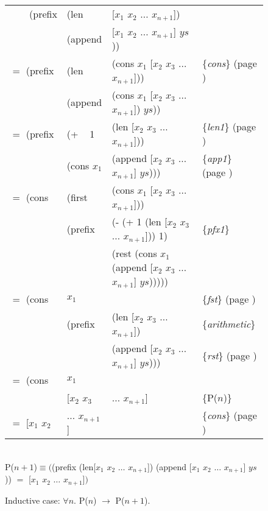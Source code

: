 \begin{figure}
\begin{center}
\begin{spacing}{0.9}
\addtolength{\tabcolsep}{-5pt}
\begin{tabular}{llll}
~~~~\textsf{(prefix} &\textsf{(len}    &\textsf{[$x_1$ $x_2$ $\dots$ $x_{n+1}$])}    &\\
            &\textsf{(append} &\textsf{[$x_1$ $x_2$ $\dots$ $x_{n+1}$] $ys$))}       &\\
$=$ \textsf{(prefix} &\textsf{(len}    &\textsf{(cons $x_1$ [$x_2$ $x_3$ $\dots$ $x_{n+1}$]))}&\{\emph{cons}\} (page \pageref{first-rest-cons})\\
            &\textsf{(append} &\textsf{(cons $x_1$ [$x_2$ $x_3$ $\dots$ $x_{n+1}$]) $ys$))}&\\
$=$	\textsf{(prefix} &\textsf{(+ ~ 1}  &\textsf{(len [$x_2$ $x_3$ $\dots$ $x_{n+1}$]))}       &\{\emph{len1}\} (page \pageref{len-equations})\\
            &\textsf{(cons $x_1$}  &\textsf{(append [$x_2$ $x_3$ $\dots$ $x_{n+1}$] $ys$)))}&\{\emph{app1}\} (page \pageref{append-equations})\\
$=$ \textsf{(cons}   &\textsf{(first}  &\textsf{(cons $x_1$ [$x_2$ $x_3$ $\dots$ $x_{n+1}$]))}&\\
            &\textsf{(prefix} &\textsf{(- (+ 1 (len [$x_2$ $x_3$ $\dots$ $x_{n+1}$])) 1)}&\{\emph{pfx1}\}\\
            &        &\textsf{(rest (cons $x_1$ (append [$x_2$ $x_3$ $\dots$ $x_{n+1}$] $ys$)))))}&\\
$=$ \textsf{(cons}   &$x_1$   &                                           &\{\emph{fst}\} (page \pageref{first-rest-cons})\\
            &\textsf{(prefix} &\textsf{(len [$x_2$ $x_3$ $\dots$ $x_{n+1}$])}        &\{\emph{arithmetic}\}\\
            &        &\textsf{(append [$x_2$ $x_3$ $\dots$ $x_{n+1}$] $ys$)))}& \{\emph{rst}\} (page \pageref{first-rest-cons})\\
$=$ \textsf{(cons}   &$x_1$   &                                          &\\
            &\textsf{[$x_2$ $x_3$} &$\dots$ $x_{n+1}$]                   &\{P($n$)\} \\
$=$ \textsf{[$x_1$ $x_2$} & \textsf{$\dots$ $x_{n+1}$]}                  &&\{\emph{cons}\} (page \pageref{first-rest-cons}) \\
\end{tabular}
\addtolength{\tabcolsep}{5pt}
\end{spacing}
~~\vspace{1mm}\\
P($n+1$)$\equiv($\textsf{(prefix (len[$x_1$ $x_2$ $\dots$ $x_{n+1}$]) (append [$x_1$ $x_2$ $\dots$ $x_{n+1}$] $ys$))} $=$
 \textsf{[$x_1$ $x_2$ $\dots$ $x_{n+1}$]}$)$
\end{center}
\caption{Inductive case: $\forall n.$ P($n$) $\rightarrow$ P($n+1$).}
\label{pfx-induc}
\end{figure}

